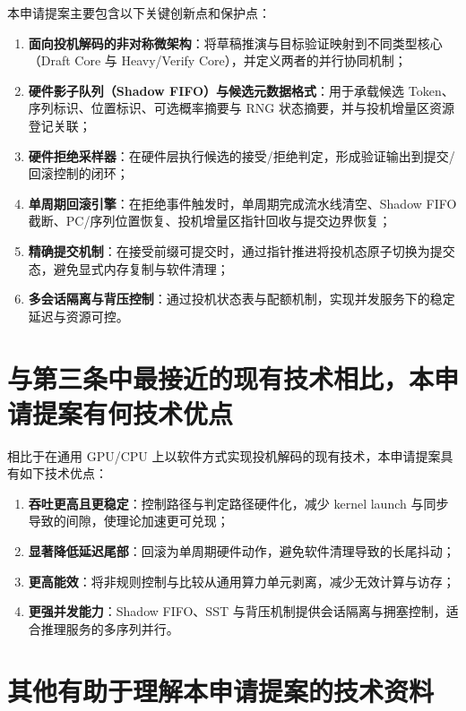 \documentclass[12pt,a4paper]{article}
\begin{document}
本申请提案主要包含以下关键创新点和保护点：
\begin{enumerate}
    \item \textbf{面向投机解码的非对称微架构}：将草稿推演与目标验证映射到不同类型核心（Draft Core 与 Heavy/Verify Core），并定义两者的并行协同机制；
    \item \textbf{硬件影子队列（Shadow FIFO）与候选元数据格式}：用于承载候选 Token、序列标识、位置标识、可选概率摘要与 RNG 状态摘要，并与投机增量区资源登记关联；
    \item \textbf{硬件拒绝采样器}：在硬件层执行候选的接受/拒绝判定，形成验证输出到提交/回滚控制的闭环；
    \item \textbf{单周期回滚引擎}：在拒绝事件触发时，单周期完成流水线清空、Shadow FIFO 截断、PC/序列位置恢复、投机增量区指针回收与提交边界恢复；
    \item \textbf{精确提交机制}：在接受前缀可提交时，通过指针推进将投机态原子切换为提交态，避免显式内存复制与软件清理；
    \item \textbf{多会话隔离与背压控制}：通过投机状态表与配额机制，实现并发服务下的稳定延迟与资源可控。
\end{enumerate}

\section{与第三条中最接近的现有技术相比，本申请提案有何技术优点}

相比于在通用 GPU/CPU 上以软件方式实现投机解码的现有技术，本申请提案具有如下技术优点：
\begin{enumerate}
    \item \textbf{吞吐更高且更稳定}：控制路径与判定路径硬件化，减少 kernel launch 与同步导致的间隙，使理论加速更可兑现；
    \item \textbf{显著降低延迟尾部}：回滚为单周期硬件动作，避免软件清理导致的长尾抖动；
    \item \textbf{更高能效}：将非规则控制与比较从通用算力单元剥离，减少无效计算与访存；
    \item \textbf{更强并发能力}：Shadow FIFO、SST 与背压机制提供会话隔离与拥塞控制，适合推理服务的多序列并行。
\end{enumerate}

\section{其他有助于理解本申请提案的技术资料}
\end{document}

